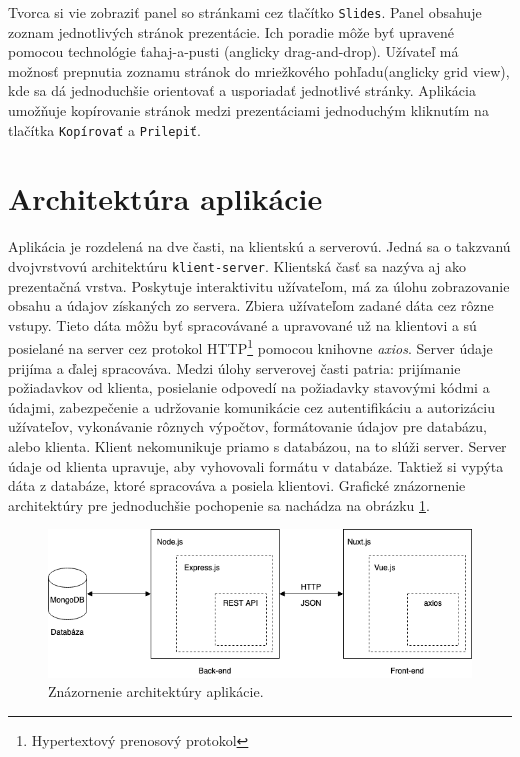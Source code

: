 Tvorca si vie zobraziť panel so stránkami cez tlačítko \texttt{Slides}. Panel obsahuje zoznam jednotlivých stránok prezentácie. Ich poradie môže byť upravené pomocou technológie ťahaj-a-pusti (anglicky drag-and-drop). Užívateľ má možnosť prepnutia zoznamu stránok do mriežkového pohľadu(anglicky grid view), kde sa dá jednoduchšie orientovať a usporiadať jednotlivé stránky. Aplikácia umožňuje kopírovanie stránok medzi prezentáciami jednoduchým kliknutím na tlačítka \texttt{Kopírovať} a \texttt{Prilepiť}.

\section{Architektúra aplikácie}
Aplikácia je rozdelená na dve časti, na klientskú a serverovú. Jedná sa o takzvanú dvojvrstvovú architektúru \texttt{klient-server}. Klientská časť sa nazýva aj ako prezentačná vrstva. Poskytuje interaktivitu užívateľom, má za úlohu zobrazovanie obsahu a údajov získaných zo servera. Zbiera užívateľom zadané dáta cez rôzne vstupy. Tieto dáta môžu byť spracovávané a upravované už na klientovi a sú posielané na server cez protokol HTTP\footnote{Hypertextový prenosový protokol} pomocou knihovne \textit{axios}. Server údaje prijíma a ďalej spracováva. Medzi úlohy serverovej časti patria: prijímanie požiadavkov od klienta, posielanie odpovedí na požiadavky stavovými kódmi a údajmi, zabezpečenie a udržovanie komunikácie cez autentifikáciu a autorizáciu užívateľov, vykonávanie rôznych výpočtov, formátovanie údajov pre databázu, alebo klienta. Klient nekomunikuje priamo s databázou, na to slúži server. Server údaje od klienta upravuje, aby vyhovovali formátu v databáze. Taktiež si vypýta dáta z databáze, ktoré spracováva a posiela klientovi. Grafické znázornenie architektúry pre jednoduchšie pochopenie sa nachádza na obrázku \ref{pic:architektura}.

    \begin{figure}[!hbt]
        \centering
        \includegraphics[scale=0.6]{obrazky/architektura.png}
        \caption{Znázornenie architektúry aplikácie.}
        \label{pic:architektura}
    \end{figure}
    
